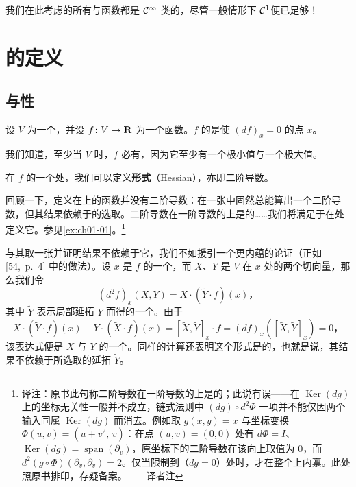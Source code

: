 
我们在此考虑的所有\trManifold{}与函数都是 $\mathcal{C}^\infty$ 类的，尽管一般情形下 $\mathcal{C}^1$\trRegularity{}便已足够！

\section{\trMorseFunction{}的定义}
\label{sec:definition-of-morse-functions}

\subsection{\trCriticalPoint{}与\trNondegenerate{}性}
\label{subsec:critical-points-nondegeneracy}

设 $V$ 为一个\trManifold，并设 $f\colon V\to\mathbf{R}$ 为一个函数。$f$ 的\trCriticalPoint{}是使 $(df)_x=0$ 的点 $x$。

\begin{remark}\label{thm:critical-points-exist-compact}
我们知道，至少当 $V$ \trCompact{}时，$f$ 必有\trCriticalPoint，因为它至少有一个极小值与一个极大值。
\end{remark}

在 $f$ 的一个\trCriticalPoint{}处，我们可以定义\textbf{\trHessian{}形式}（Hessian），亦即二阶导数。

\begin{remark}\label{thm:hessian-only-at-critical-points}
回顾一下，定义在\trManifold{}上的函数并没有二阶导数：在一张\trChart{}中固然总能算出一个二阶导数，但其结果依赖于\trChart{}的选取。二阶导数在一阶导数的\trKernel{}上是\trWellDefined{}的……我们将满足于在\trCriticalPoint{}处定义它。参见\cref{ex:ch01-01}。\footnote{译注：原书此句称二阶导数在一阶导数的\trKernel{}上是\trWellDefined{}的；此说有误——\trHessian{}在 $\operatorname{Ker}(dg)$ 上的坐标无关性一般并不成立，链式法则中 $(dg)\circ d^{2}\Phi$ 一项并不能仅因两个输入同属 $\operatorname{Ker}(dg)$ 而消去。例如取 $g(x,y)=x$ 与坐标变换 $\Phi(u,v)=(u+v^{2},\,v)$：在点 $(u,v)=(0,0)$ 处有 $d\Phi=I$、$\operatorname{Ker}(dg)=\operatorname{span}(\partial_{v})$，原坐标下的二阶导数在该向上取值为 $0$，而 $d^{2}(g\circ\Phi)(\partial_{v},\partial_{v})=2$。仅当限制到\trCriticalPoint{}（$dg=0$）处时，\trHessian{}才在整个\trTangentSpace{}上内禀。此处照原书排印，存疑备案。——译者注}
\end{remark}

与其取一张\trChart{}并证明结果不依赖于它，我们不如援引一个更内蕴的论证（正如 [54,~p.~4] 中的做法）。设 $x$ 是 $f$ 的一个\trCriticalPoint，而 $X$、$Y$ 是 $V$ 在 $x$ 处的两个切向量，那么我们令
\[
(d^2f)_x(X,Y)=X\cdot(\widetilde{Y}\cdot f)(x)\text{，}
\]
其中 $\widetilde{Y}$ 表示局部延拓 $Y$ 而得的一个\trVectorField。由于
\[
X\cdot(\widetilde{Y}\cdot f)(x)-Y\cdot(\widetilde{X}\cdot f)(x)=[\widetilde{X},\widetilde{Y}]_x\cdot f=(df)_x([\widetilde{X},\widetilde{Y}]_x)=0\text{，}
\]
该表达式便是 $X$ 与 $Y$ 的一个\trSymmetricBilinearForm。同样的计算还表明这个形式是\trWellDefined{}的，也就是说，其结果不依赖于所选取的延拓 $\widetilde{Y}$。


